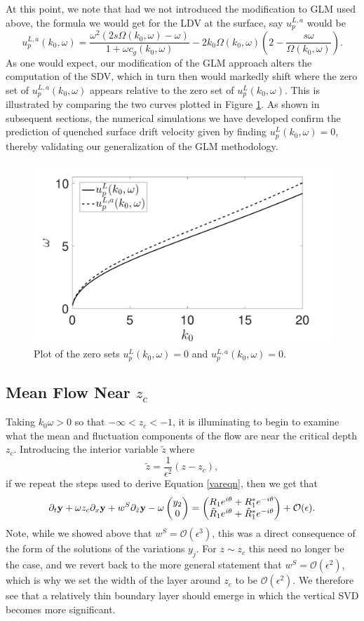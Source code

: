 \documentclass{JFM_Style/jfm}
\newcommand{\bp}{\begin{pmatrix}}
\newcommand{\ep}{\end{pmatrix}}
\newcommand{\pd}{\partial}
\begin{document}
At this point, we note that had we not introduced the modification to GLM used above, the formula we would get for the LDV at the surface, say $u_{p}^{L,a}$ would be 
\[
u^{L,a}_{p}(k_{0},\omega) =  \frac{ \omega^{2}(2s\Omega(k_{0},\omega) - \omega)}{1+\omega c_{g}(k_{0},\omega)} - 2k_{0}\Omega(k_{0},\omega)\left( 2 - \frac{s\omega}{\Omega(k_{0},\omega)} \right). 
\]
As one would expect, our modification of the GLM approach alters the computation of the SDV, which in turn then would markedly shift where the zero set of $u^{L,a}_{p}(k_{0},\omega)$ appears relative to the zero set of $u^{L}_{p}(k_{0},\omega)$.  This is illustrated by comparing the two curves plotted in Figure \ref{fig:zerodriftk0}.  As shown in subsequent sections, the numerical simulations we have developed confirm the prediction of quenched surface drift velocity given by finding $u^{L}_{p}(k_{0},\omega)=0$, thereby validating our generalization of the GLM methodology.  
\begin{figure}
\centering
\includegraphics[width=.55\textwidth]{zero_return_shear}
\caption{\small Plot of the zero sets $u^{L}_{p}(k_{0},\omega)=0$ and $u^{L,a}_{p}(k_{0},\omega)=0$.}
\label{fig:zerodriftk0}
\end{figure}

\subsection{Mean Flow Near $z_{c}$}
Taking $k_{0}\omega >0$ so that $-\infty<z_{c}<-1$, it is illuminating to begin to examine what the mean and fluctuation components of the flow are near the critical depth $z_{c}$.  Introducing the interior variable $\tilde{z}$ where
$$
\tilde{z} = \frac{1}{\epsilon^{2}}\left(z - z_{c} \right), 
$$
if we repeat the steps used to derive Equation \eqref{vareqn}, then we get that
\begin{equation}
\pd_{t}{\bf y} + \omega z_{c} \pd_{x}{\bf y}  + w^{S}\pd_{\tilde{z}}{\bf y} - \omega \bp y_{2}\\ 0 \ep = \bp R_{1}e^{i\theta}+R^{\ast}_{1}e^{-i\theta}\\ \tilde{R}_{1}e^{i\theta}+\tilde{R}^{\ast}_{1}e^{-i\theta} \ep + \mathcal{O}(\epsilon).
\label{modvareqn}
\end{equation}
 Note, while we showed above that $w^{S}=\mathcal{O}(\epsilon^{3})$, this was a direct consequence of the form of the solutions of the variations $y_{j}$.  For $z\sim z_{c}$ this need no longer be the case, and we revert back to the more general statement that  $w^{S}=\mathcal{O}(\epsilon^{2})$, which is why we set the width of the layer around $z_{c}$ to be $\mathcal{O}(\epsilon^{2})$.  We therefore see that a relatively thin boundary layer should emerge in which the vertical SVD becomes more significant.  
 
\end{document}
